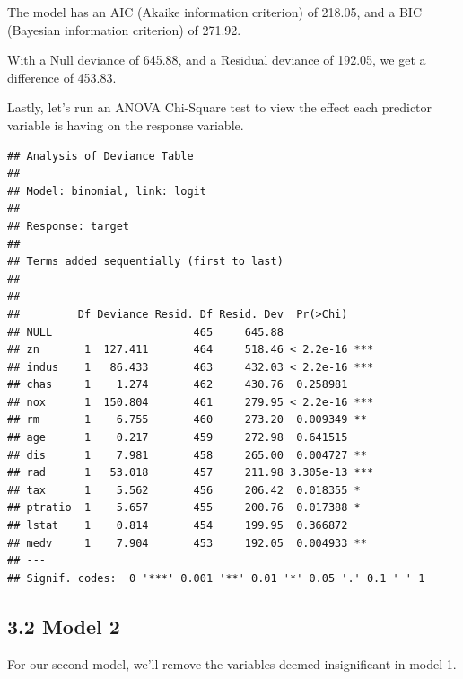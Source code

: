 \documentclass[]{article}
\begin{document}

The model has an AIC (Akaike information criterion) of 218.05, and a BIC
(Bayesian information criterion) of 271.92.

With a Null deviance of 645.88, and a Residual deviance of 192.05, we
get a difference of 453.83.

Lastly, let's run an ANOVA Chi-Square test to view the effect each
predictor variable is having on the response variable.

\begin{verbatim}
## Analysis of Deviance Table
## 
## Model: binomial, link: logit
## 
## Response: target
## 
## Terms added sequentially (first to last)
## 
## 
##         Df Deviance Resid. Df Resid. Dev  Pr(>Chi)    
## NULL                      465     645.88              
## zn       1  127.411       464     518.46 < 2.2e-16 ***
## indus    1   86.433       463     432.03 < 2.2e-16 ***
## chas     1    1.274       462     430.76  0.258981    
## nox      1  150.804       461     279.95 < 2.2e-16 ***
## rm       1    6.755       460     273.20  0.009349 ** 
## age      1    0.217       459     272.98  0.641515    
## dis      1    7.981       458     265.00  0.004727 ** 
## rad      1   53.018       457     211.98 3.305e-13 ***
## tax      1    5.562       456     206.42  0.018355 *  
## ptratio  1    5.657       455     200.76  0.017388 *  
## lstat    1    0.814       454     199.95  0.366872    
## medv     1    7.904       453     192.05  0.004933 ** 
## ---
## Signif. codes:  0 '***' 0.001 '**' 0.01 '*' 0.05 '.' 0.1 ' ' 1
\end{verbatim}

\subsection{3.2 Model 2}\label{model-2}

For our second model, we'll remove the variables deemed insignificant in
model 1.
\end{document}
